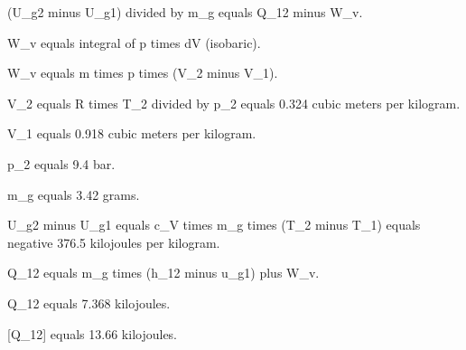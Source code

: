 (U_g2 minus U_g1) divided by m_g equals Q_12 minus W_v.  

W_v equals integral of p times dV (isobaric).  

W_v equals m times p times (V_2 minus V_1).  

V_2 equals R times T_2 divided by p_2 equals 0.324 cubic meters per kilogram.  

V_1 equals 0.918 cubic meters per kilogram.  

p_2 equals 9.4 bar.  

m_g equals 3.42 grams.  

U_g2 minus U_g1 equals c_V times m_g times (T_2 minus T_1) equals negative 376.5 kilojoules per kilogram.  

Q_12 equals m_g times (h_12 minus u_g1) plus W_v.  

Q_12 equals 7.368 kilojoules.  

[Q_12] equals 13.66 kilojoules.